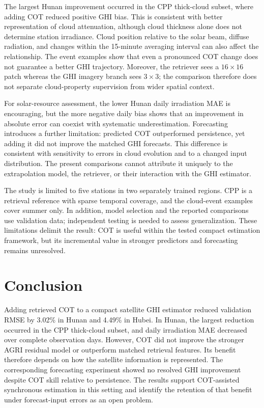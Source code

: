 \documentclass[11pt]{article}
\begin{document}
The largest Hunan improvement occurred in the CPP thick-cloud subset, where adding COT reduced positive GHI bias. This is consistent with better representation of cloud attenuation, although cloud thickness alone does not determine station irradiance. Cloud position relative to the solar beam, diffuse radiation, and changes within the 15-minute averaging interval can also affect the relationship. The event examples show that even a pronounced COT change does not guarantee a better GHI trajectory. Moreover, the retriever sees a $16\times16$ patch whereas the GHI imagery branch sees $3\times3$; the comparison therefore does not separate cloud-property supervision from wider spatial context.

For solar-resource assessment, the lower Hunan daily irradiation MAE is encouraging, but the more negative daily bias shows that an improvement in absolute error can coexist with systematic underestimation. Forecasting introduces a further limitation: predicted COT outperformed persistence, yet adding it did not improve the matched GHI forecasts. This difference is consistent with sensitivity to errors in cloud evolution and to a changed input distribution. The present comparisons cannot attribute it uniquely to the extrapolation model, the retriever, or their interaction with the GHI estimator.

The study is limited to five stations in two separately trained regions. CPP is a retrieval reference with sparse temporal coverage, and the cloud-event examples cover summer only. In addition, model selection and the reported comparisons use validation data; independent testing is needed to assess generalization. These limitations delimit the result: COT is useful within the tested compact estimation framework, but its incremental value in stronger predictors and forecasting remains unresolved.

\section{Conclusion}
Adding retrieved COT to a compact satellite GHI estimator reduced validation RMSE by 3.02\% in Hunan and 4.49\% in Hubei. In Hunan, the largest reduction occurred in the CPP thick-cloud subset, and daily irradiation MAE decreased over complete observation days. However, COT did not improve the stronger AGRI residual model or outperform matched retrieval features. Its benefit therefore depends on how the satellite information is represented. The corresponding forecasting experiment showed no resolved GHI improvement despite COT skill relative to persistence. The results support COT-assisted synchronous estimation in this setting and identify the retention of that benefit under forecast-input errors as an open problem.
\end{document}
